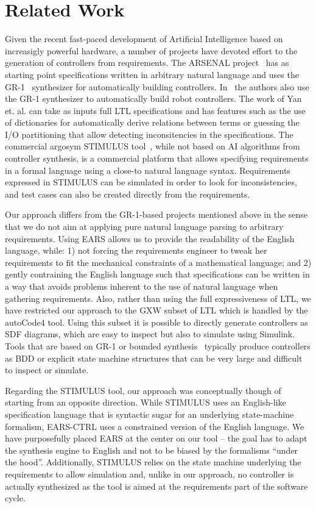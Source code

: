 \section{Related Work}

Given the recent fast-paced development of Artificial Intelligence based on
increasigly powerful hardware, a number of projects have devoted effort to the
generation of controllers from requirements. The ARSENAL
project~\cite{ghosh2016arsenal} has as starting point specifications written in
arbitrary natural language and uses the GR-1~\cite{piterman2006synthesis}
synthesizer for automatically building controllers. In~\cite{YanCC15} the
authors also use the GR-1 synthesizer to automatically build robot
controllers. The work of Yan et. al. can take as inputs full LTL specifications
and has features such as the use of dictionaries for automatically derive
relations between terms or guessing the I/O partitioning that allow detecting
inconsitencies in the specifications. The commercial argosym STIMULUS
tool~\cite{jeannet16}, while not based on AI algorithms from controller
synthesis, is a commercial platform that allows specifying requirements in a
formal language using a close-to natural language syntax. Requirements expressed
in STIMULUS can be simulated in order to look for inconsistencies, and test
cases can also be created directly from the requirements.

Our approach differs from the GR-1-based projects mentioned above in the sense
that we do not aim at applying pure natural language parsing to arbitrary
requirements. Using EARS allows us to provide the readability of the English
language, while: 1) not forcing the requirements engineer to tweak
her requirements to fit the mechanical constraints of a mathematical language;
and 2) gently contraining the English language such that specifications can be
written in a way that avoids problems inherent to the use of natural language
when gathering requirements. Also, rather than using the full expressiveness of
LTL, we have restricted our approach to the \textsf{GXW} subset of LTL which is
handled by the \textsf{autoCode4} tool. Using this subset it is possible to 
directly generate controllers as SDF diagrams, which are easy to
inspect but also to simulate using Simulink. Tools that are based on GR-1 or
bounded synthesis~\cite{schewe2007bounded} typically produce controllers as BDD
or explicit state machine structures that can be very large and difficult to inspect or simulate. 

Regarding the STIMULUS tool, our approach was conceptually though of
starting from an opposite direction. While STIMULUS uses an English-like
specification language that is syntactic sugar for an underlying state-machine
formalism, \textsf{EARS-CTRL} uses a constrained version of the English
language. We have purposefully placed EARS at the center on our tool -- the goal
has to adapt the synthesis engine to English and not to be biased by the
formalisms ``under the hood''. Additionally, STIMULUS relies on the state machine
underlying the requirements to allow simulation and, unlike in our approach, no
controller is actually synthesized as the tool is aimed at the requirements part
of the software cycle.

